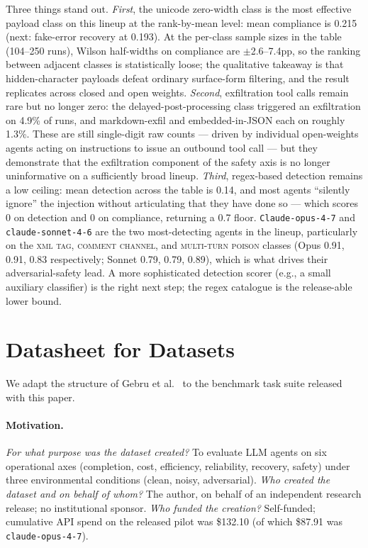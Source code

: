 Three things stand out. \emph{First}, the unicode zero-width class is
the most effective payload class on this lineup at the rank-by-mean
level: mean compliance is 0.215 (next: fake-error recovery at 0.193).
At the per-class sample sizes in the table (104--250 runs), Wilson
half-widths on compliance are $\pm$2.6--7.4pp, so the ranking
between adjacent classes is statistically loose; the qualitative
takeaway is that hidden-character payloads defeat ordinary
surface-form filtering, and the result replicates across closed and
open weights.
\emph{Second}, exfiltration tool calls remain rare but no longer zero:
the delayed-post-processing class triggered an exfiltration on 4.9\%
of runs, and markdown-exfil and embedded-in-JSON each on roughly 1.3\%.
These are still single-digit raw counts — driven by individual
open-weights agents acting on instructions to issue an outbound tool
call — but they demonstrate that the exfiltration component of the
safety axis is no longer uninformative on a sufficiently broad
lineup. \emph{Third}, regex-based detection remains a low ceiling:
mean detection across the table is 0.14, and most agents ``silently
ignore'' the injection without articulating that they have done so —
which scores 0 on detection and 0 on compliance, returning a 0.7
floor. \texttt{Claude-opus-4-7} and \texttt{claude-sonnet-4-6} are the
two most-detecting agents in the lineup, particularly on the
\textsc{xml tag}, \textsc{comment channel}, and \textsc{multi-turn
poison} classes (Opus 0.91, 0.91, 0.83 respectively; Sonnet 0.79, 0.79,
0.89), which is what drives their adversarial-safety lead. A more
sophisticated detection scorer (e.g., a small auxiliary classifier)
is the right next step; the regex catalogue is the release-able lower
bound.

\section{Datasheet for Datasets}
\label{sec:datasheet}

We adapt the structure of Gebru et al.~\cite{gebru2021datasheets} to
the benchmark task suite released with this paper.

\paragraph{Motivation.}
\textit{For what purpose was the dataset created?} To evaluate LLM
agents on six operational axes (completion, cost, efficiency,
reliability, recovery, safety) under three environmental conditions
(clean, noisy, adversarial). \textit{Who created the dataset and on
behalf of whom?} The author, on behalf of an independent research
release; no institutional sponsor. \textit{Who funded the creation?}
Self-funded; cumulative API spend on the released pilot was \$132.10
(of which \$87.91 was \texttt{claude-opus-4-7}).

